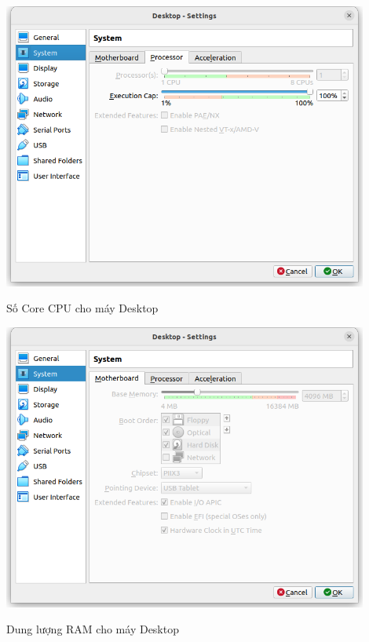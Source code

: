 \documentclass[a4paper, 11pt]{article}
\begin{document}
\begin{itemize}
\begin{enumerate}
                    \begin{minipage}
                        {\linewidth}
                        \captionsetup{type=figure}
                        \centering
                        \includegraphics[width=12cm]{images/desktop-processor.png}
                        \caption{Số Core CPU cho máy Desktop}
                        \label{figure:desktop-processor}
                    \end{minipage}

                    \begin{minipage}
                        {\linewidth}
                        \captionsetup{type=figure}
                        \centering
                        \includegraphics[width=12cm]{images/desktop-ram.png}
                        \caption{Dung lượng RAM cho máy Desktop}
                        \label{figure:desktop-ram}
                    \end{minipage}


\end{enumerate}
\end{itemize}
\end{document}

